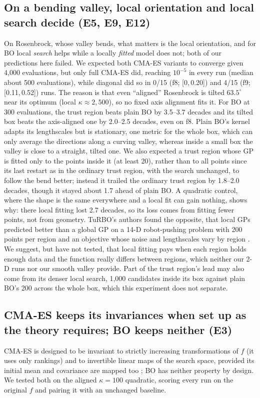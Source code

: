 \documentclass[10pt,a4paper]{article}
\newcommand{\ci}[2]{[#1,\,#2]}
\begin{document}
\subsection{On a bending valley, local orientation and local search decide (E5, E9, E12)}\label{sec:bend}
On Rosenbrock, whose valley bends, what matters is the local orientation, and for BO local \emph{search} helps while a locally
\emph{fitted} model does not; both of our predictions here failed. We expected both CMA-ES variants to converge given 4,000
evaluations, but only full CMA-ES did, reaching $10^{-5}$ in every run (median about 500 evaluations), while diagonal did so in 0/15
(f8; \ci{0}{0.20}) and 4/15 (f9; \ci{0.11}{0.52}) runs. The reason is that even ``aligned'' Rosenbrock is tilted $63.5^\circ$ near its optimum (local
$\kappa\approx2{,}500$), so no fixed axis alignment fits it. For BO at 300 evaluations, the trust region beats plain BO by 3.5--3.7
decades and its tilted box beats the axis-aligned one by 2.0--2.5 decades, even on f8. Plain BO's kernel adapts its lengthscales but
is stationary, one metric for the whole box, which can only average the directions along a curving valley, whereas inside a small box
the valley is close to a straight, tilted one. We also expected a trust region whose GP is fitted only to the points inside it (at
least 20), rather than to all points since its last restart as in the ordinary trust region, with the search
unchanged, to follow the bend better; instead it trailed the ordinary trust region by 1.8--2.0 decades, though it stayed about 1.7
ahead of plain BO. A quadratic control, where the shape is the same everywhere and a local fit can gain nothing, shows why: there
local fitting lost 2.7 decades, so its loss comes from fitting fewer points, not from geometry. TuRBO's authors found the opposite,
that local GPs predicted better than a global GP on a 14-D robot-pushing problem with 200 points per region and an objective whose
noise and lengthscales vary by region \citep[Sec.~3.6]{eriksson2019turbo}. We suggest, but have not tested, that local fitting pays
when each region holds enough data and the function really differs between regions, which neither our 2-D runs nor our smooth
valley provide. Part of the trust region's lead may also come from its denser local search, 1,000 candidates inside its box against
plain BO's 200 across the whole box, which this experiment does not separate.

\subsection{CMA-ES keeps its invariances when set up as the theory requires; BO keeps neither (E3)}\label{sec:invariance}
CMA-ES is designed to be invariant to strictly increasing transformations of $f$ (it uses only rankings) and
to invertible linear maps of the search space, provided its initial mean and covariance are mapped too
\citep{hansen2016tutorial}; BO has neither property by design. We tested both on the aligned $\kappa=100$
quadratic, scoring every run on the original $f$ and pairing it with an unchanged baseline.
\end{document}
